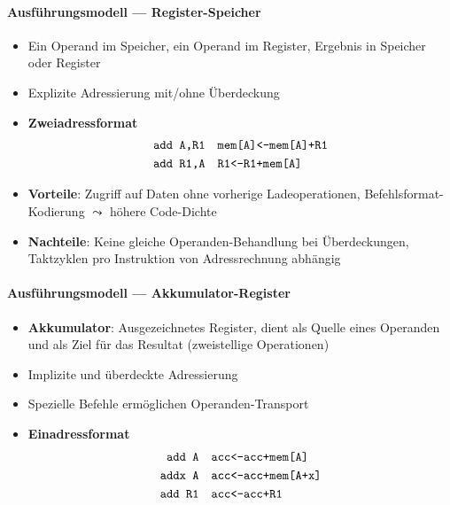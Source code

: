 \paragraph{Ausführungsmodell --- Register-Speicher}
\begin{itemize}
	\item Ein Operand im Speicher, ein Operand im Register, Ergebnis in Speicher oder Register
	\item Explizite Adressierung mit/ohne Überdeckung
	\item \textbf{Zweiadressformat}
	\begin{align*}
		\text{\code{add A,R1}} &\quad \text{\code{mem[A]<-mem[A]+R1}} \\
		\text{\code{add R1,A}} &\quad \text{\code{R1<-R1+mem[A]}}
	\end{align*}
	\item \textbf{Vorteile}: Zugriff auf Daten ohne vorherige Ladeoperationen, Befehlsformat-Kodierung $\leadsto$ höhere Code-Dichte
	\item \textbf{Nachteile}: Keine gleiche Operanden-Behandlung bei Überdeckungen, Taktzyklen pro Instruktion von Adressrechnung abhängig
\end{itemize}

\paragraph{Ausführungsmodell --- Akkumulator-Register}
\begin{itemize}
	\item \textbf{Akkumulator}: Ausgezeichnetes Register, dient als Quelle eines Operanden und als Ziel für das Resultat (zweistellige Operationen)
	\item Implizite und überdeckte Adressierung
	\item Spezielle Befehle ermöglichen Operanden-Transport
	\item \textbf{Einadressformat}
	\begin{align*}
		\text{\code{add A}} &\quad \text{\code{acc<-acc+mem[A]}} \\
		\text{\code{addx A}} &\quad \text{\code{acc<-acc+mem[A+x]}} \\
		\text{\code{add R1}} &\quad \text{\code{acc<-acc+R1}}
	\end{align*}
\end{itemize}

